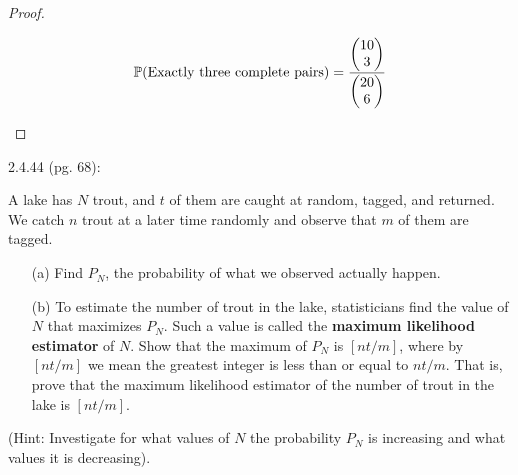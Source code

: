 \documentclass{article}
\begin{document}
\begin{proof}
\begin{itemize}
        \begin{align}
            \mathbb{P}(\text{Exactly three complete pairs})=\frac{\begin{pmatrix}10\\3\end{pmatrix}}{\begin{pmatrix}20\\6\end{pmatrix}}
        \end{align}
    \end{itemize}
\end{proof}

\newpage

\begin{ques}\label{q6}
    2.4.44 (pg. 68):

    A lake has $N$ trout, and $t$ of them are caught at random, tagged, and returned. We catch $n$ trout at a later time randomly and observe that $m$ of them are tagged.
    \begin{itemize}
        \item[(a)] Find $P_N$, the probability of what we observed actually happen.
        \item[(b)] To estimate the number of trout in the lake, statisticians find the value of $N$ that maximizes $P_N$. Such a value is called the \textbf{maximum likelihood estimator} of $N$. Show that the maximum of $P_N$ is $[nt/m]$, where by $[nt/m]$ we mean the greatest integer is less than or equal to $nt/m$. That is, prove that the maximum likelihood estimator of the number of trout in the lake is $[nt/m]$. 
    \end{itemize}

    (Hint: Investigate for what values of $N$ the probability $P_N$ is increasing and what values it is decreasing).
\end{ques}
\end{document}
